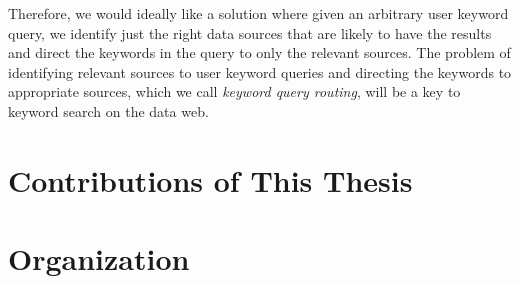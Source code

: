 Therefore, we would ideally like a solution where given an arbitrary user keyword query, we identify
just the right data sources that are likely to have the results and direct the keywords in the query
to only the relevant sources. The problem of identifying relevant sources to user keyword queries and
directing the keywords to appropriate sources, which we call {\em keyword query routing}, will be a
key to keyword search on the data web.

\section{Contributions of This Thesis}\label{intro:contribution}


\section{Organization}\label{intro:organization}

